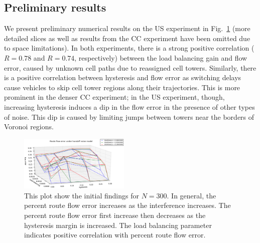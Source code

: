 \subsection{Preliminary results}

We present preliminary numerical results on the US experiment in Fig.~\ref{fig:results1} (more detailed slices as well as results from the CC experiment have been omitted due to space limitations). In both experiments, there is a strong positive correlation ($R=0.78$ and $R=0.74$, respectively) between the load balancing gain and flow error, caused by unknown cell paths due to reassigned cell towers. Similarly, there is a positive correlation between hysteresis and flow error as switching delays cause vehicles to skip cell tower regions along their trajectories.  This is more prominent in the denser CC experiment; in the US experiment, though, increasing hysteresis induces a dip in the flow error in the presence of other types of noise. This dip is caused by limiting jumps between towers near the borders of Voronoi regions. 

\begin{figure}[ht]
  \centering
    \includegraphics[width=0.47\textwidth]{figures/results_300_hysteresis.png}
  \caption{\footnotesize{This plot show the initial findings for $N=300$. In general, the percent route flow error increases as the interference increases. The percent route flow error first increase then decreases as the hysteresis margin is increased. The load balancing parameter indicates positive correlation with percent route flow error.}}
  \label{fig:results1}
\end{figure}

